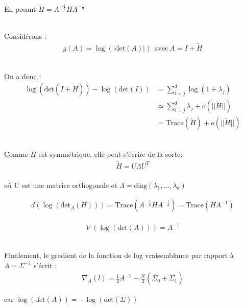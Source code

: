\documentclass{article}
\begin{document}
\begin{enumerate}
\begin{enumerate}[label=(\alph*)]
\\En posant $\widetilde{H}=A^{-\frac{1}{2}}HA^{-\frac{1}{2}}$

\\Considérons :
\begin{align*}
g(A)= \log(|\textrm{det}(A)|) \ \ \textrm{avec} \ A=I+\widetilde{H}
\end{align*}

\\On a donc : 
\begin{align*}
\log(\textrm{det}(I+\widetilde{H}))-\log(\textrm{det}(I))&=\sum_{i=j}^{d}\log(1+\lambda_j)\\
&\simeq \sum_{i=j}^{d} \lambda_j + o(||\widetilde{H}||)\\
&=\textrm{Trace}(\widetilde{H})+ o(||\widetilde{H}||)
\end{align*}

\\Comme $\widetilde{H}$ est symmétrique, elle peut s'écrire de la sorte: 
\begin{align*}
\widetilde{H} = U \Lambda U^T
\end{align*}
\\où U est une matrice orthogonale et
$\Lambda=\textrm{diag}(\lambda_1,...,\lambda_d)$

\begin{align*}
d(\log(\textrm{det}_A(H)))=\textrm{Trace}(A^{-\frac{1}{2}}HA^{-\frac{1}{2}}) = \textrm{Trace}(HA^{-1})
\end{align*}

\begin{align*}
\nabla(\log(\textrm{det}(A)))=A^{-1}
\end{align*}

\\Finalement, le gradient de la fonction de log vraisemblance par rapport à $A=\Sigma^{-1}$ s'écrit :
\begin{align*}
\nabla_A(l)=\frac{1}{2}A^{-1}-\frac{N}{2}(\widetilde{\Sigma_0}+\widetilde{\Sigma_1})
\end{align*}

car $\log(\textrm{det}(A))=-\log(\textrm{det}(\Sigma))$


\end{enumerate}
\end{enumerate}
\end{document}
